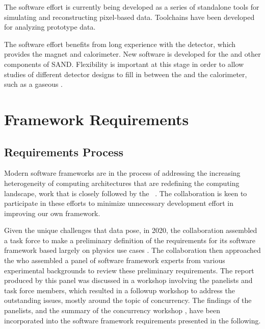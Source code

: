 \documentclass[../main-v1.tex]{subfiles}
\begin{document}
The  software effort is currently being developed as a series of standalone tools for simulating and reconstructing pixel-based  data.  Toolchains have been developed for analyzing  prototype data.

The  software effort benefits from long experience with the  detector, which provides the magnet and calorimeter.  New software is developed for the  and other components of SAND.  Flexibility is important at this stage in order to allow studies of different detector designs to fill in between the  and the calorimeter, such as a gaseous . %


\section{Framework Requirements }
\subsection{Requirements Process} %
Modern  software frameworks are in the process of addressing the increasing heterogeneity of computing architectures that are redefining the computing landscape, work that is closely followed by the ~\cite{Alves:2017she, Calafiura:2018rwe}. The  collaboration is keen to participate in these efforts to minimize unnecessary development effort in improving our own framework. 

Given the unique challenges that  data pose, in 2020, the collaboration assembled a task force to make a preliminary definition of the requirements for its software framework based largely on physics use cases \cite{bib:docdb21934}.  The collaboration then approached the  who assembled a panel of software framework experts from various experimental backgrounds to review these preliminary requirements. The report \cite{bib:docdb24423} produced by this panel was discussed in a workshop involving the panelists and task force members, which resulted in a followup workshop to address the outstanding issues, mostly around the topic of concurrency.  The findings of the panelists, and the summary of the concurrency workshop \cite{bib:docdb24426}, have been incorporated into the  software framework requirements presented in the following.
\end{document}
